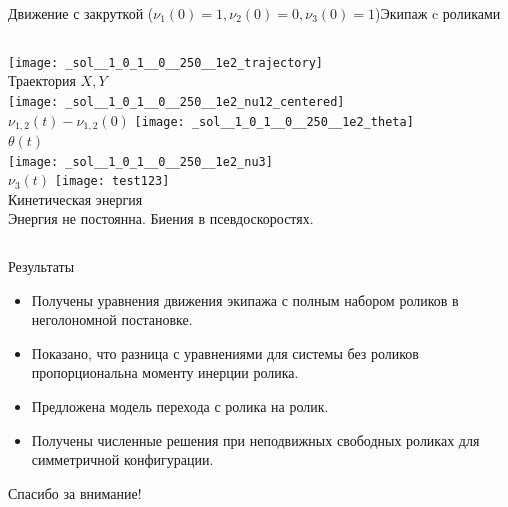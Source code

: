 \documentclass{beamer}
\begin{document}
\begin{frame}{Движение с закруткой ($\nu_1(0) = 1, \nu_2(0) = 0, \nu_3(0) = 1$)}{Экипаж c роликами}
    \begin{columns}
            \centering
            \texttt{[image: \_sol\_\_1\_0\_1\_\_0\_\_250\_\_1e2\_trajectory]} \\
            Траектория $X, Y$ \\
            \texttt{[image: \_sol\_\_1\_0\_1\_\_0\_\_250\_\_1e2\_nu12\_centered]} \\
            $\nu_{1,2}(t) - \nu_{1,2}(0)$
            \centering
            \texttt{[image: \_sol\_\_1\_0\_1\_\_0\_\_250\_\_1e2\_theta]} \\
            $\theta(t)$ \\
            \texttt{[image: \_sol\_\_1\_0\_1\_\_0\_\_250\_\_1e2\_nu3]} \\
            $\nu_3(t)$
            \centering
            \texttt{[image: test123]} \\
            Кинетическая энергия \\
            \vspace{15pt}
            Энергия не постоянна. Биения в псевдоскоростях.
    \end{columns}
\end{frame}

\begin{frame}{Результаты}
  \begin{itemize}
  \item
    Получены уравнения движения экипажа \alert{с полным набором роликов} в неголономной постановке.
  \item
    Показано, что разница с уравнениями для системы без роликов пропорциональна моменту инерции ролика.
  \item Предложена модель перехода с ролика на ролик.
  \item
    Получены численные решения при неподвижных свободных роликах для симметричной конфигурации.
  \end{itemize}
  \vspace{10pt}
  \centering
  \textcolor{Periwinkle}{Спасибо за внимание!}
\end{frame}
\end{document}
